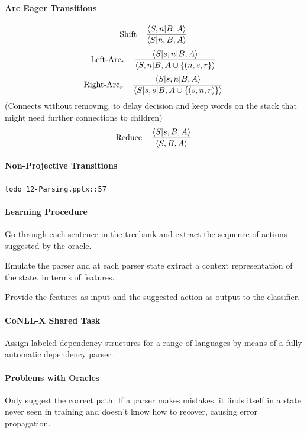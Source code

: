 \documentclass[10pt]{report}
\begin{document}
\paragraph{Arc Eager Transitions}
$$\hbox{Shift}\:\:\:\:\:\frac{\langle S, n|B, A\rangle}{\langle S|n, B, A\rangle}$$
$$\hbox{Left-Arc}_r\:\:\:\:\:\frac{\langle S|s, n|B, A\rangle}{\langle S, n|B, A\cup\{(n, s, r\}\rangle}$$
$$\hbox{Right-Arc}_r\:\:\:\:\:\frac{\langle S|s, n|B, A\rangle}{\langle S|s, s|B, A\cup\{(s,n,r)\}\rangle}$$
(Connects without removing, to delay decision and keep words on the stack that might need further connections to children)
$$\hbox{Reduce}\:\:\:\:\:\frac{\langle S|s, B, A\rangle}{\langle S, B, A\rangle}$$
\paragraph{Non-Projective Transitions} \begin{list}{}{}
	\item \texttt{todo 12-Parsing.pptx::57}
\end{list}
\paragraph{Learning Procedure}
\begin{list}{}{}
	\item Go through each sentence in the treebank and extract the sequence of actions suggested by the oracle.
	\item Emulate the parser and at each parser state extract a context representation of the state, in terms of features.
	\item Provide the features as input and the suggested action as output to the classifier.
\end{list}
\paragraph{CoNLL-X Shared Task} Assign labeled dependency structures for a range of languages by means of a fully automatic dependency parser.
\paragraph{Problems with Oracles} Only suggest the correct path. If a parser makes mistakes, it finds itself in a state never seen in training and doesn't know how to recover, causing error propagation.
\end{document}
